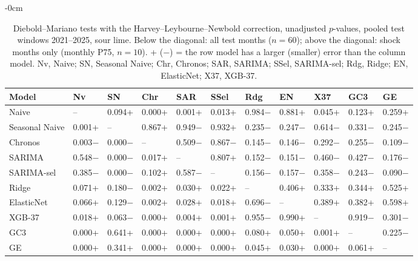 \begin{table}[H]
\centering
\footnotesize
\setlength{\tabcolsep}{4pt}
\caption{Diebold--Mariano tests with the Harvey--Leybourne--Newbold correction, unadjusted $p$-values, pooled test windows 2021--2025, sour lime. Below the diagonal: all test months ($n=60$); above the diagonal: shock months only (monthly P75, $n=10$). + ($-$) = the row model has a larger (smaller) error than the column model. Nv, Naive; SN, Seasonal Naive; Chr, Chronos; SAR, SARIMA; SSel, SARIMA-sel; Rdg, Ridge; EN, ElasticNet; X37, XGB-37.}
\label{tab:T09_DM_matriz_principal_2021_2025_sutil}
\begin{adjustwidth}{-\extralength}{0cm}
\centering
\begin{tabular}{lllllllllll}
\toprule
Model & Nv & SN & Chr & SAR & SSel & Rdg & EN & X37 & GC3 & GE \\
\midrule
Naive & -- & 0.094+ & 0.000+ & 0.001+ & 0.013+ & 0.984$-$ & 0.881+ & 0.045+ & 0.123+ & 0.259+ \\
Seasonal Naive & 0.001+ & -- & 0.867+ & 0.949$-$ & 0.932+ & 0.235$-$ & 0.247$-$ & 0.614$-$ & 0.331$-$ & 0.245$-$ \\
Chronos & 0.003$-$ & 0.000$-$ & -- & 0.509$-$ & 0.867$-$ & 0.145$-$ & 0.146$-$ & 0.292$-$ & 0.255$-$ & 0.109$-$ \\
SARIMA & 0.548$-$ & 0.000$-$ & 0.017+ & -- & 0.807+ & 0.152$-$ & 0.151$-$ & 0.460$-$ & 0.427$-$ & 0.176$-$ \\
SARIMA-sel & 0.385$-$ & 0.000$-$ & 0.102+ & 0.587$-$ & -- & 0.156$-$ & 0.157$-$ & 0.358$-$ & 0.243$-$ & 0.090$-$ \\
Ridge & 0.071+ & 0.180$-$ & 0.002+ & 0.030+ & 0.022+ & -- & 0.406+ & 0.333+ & 0.344+ & 0.525+ \\
ElasticNet & 0.066+ & 0.129$-$ & 0.002+ & 0.028+ & 0.018+ & 0.696$-$ & -- & 0.389+ & 0.382+ & 0.598+ \\
XGB-37 & 0.018+ & 0.063$-$ & 0.000+ & 0.004+ & 0.001+ & 0.955$-$ & 0.990+ & -- & 0.919$-$ & 0.301$-$ \\
GC3 & 0.000+ & 0.641+ & 0.000+ & 0.000+ & 0.000+ & 0.080+ & 0.050+ & 0.001+ & -- & 0.225$-$ \\
GE & 0.000+ & 0.341+ & 0.000+ & 0.000+ & 0.000+ & 0.045+ & 0.030+ & 0.000+ & 0.061+ & -- \\
\bottomrule
\end{tabular}
\end{adjustwidth}
\end{table}

